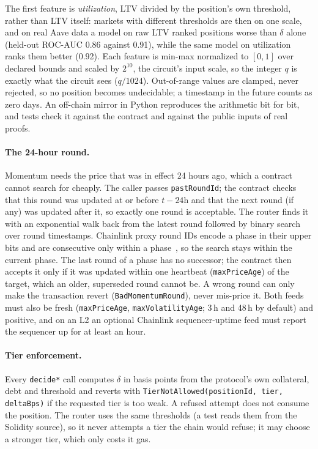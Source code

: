 \documentclass[sigconf,nonacm]{acmart}
\newcommand{\code}[1]{\texttt{\smaller #1}}
\begin{document}
The first feature is \emph{utilization}, LTV divided by the position's own threshold, rather than LTV itself: markets with different thresholds are then on one scale, and on real Aave data a model on raw LTV ranked positions worse than $\delta$ alone (held-out ROC-AUC 0.86 against 0.91), while the same model on utilization ranks them better (0.92). Each feature is min-max normalized to $[0,1]$ over declared bounds and scaled by $2^{10}$, the circuit's input scale, so the integer $q$ is exactly what the circuit sees ($q/1024$). Out-of-range values are clamped, never rejected, so no position becomes undecidable; a timestamp in the future counts as zero days. An off-chain mirror in Python reproduces the arithmetic bit for bit, and tests check it against the contract and against the public inputs of real proofs.

\paragraph{The 24-hour round.} Momentum needs the price that was in effect 24 hours ago, which a contract cannot search for cheaply. The caller passes \code{pastRoundId}; the contract checks that this round was updated at or before $t-24\text{h}$ and that the next round (if any) was updated after it, so exactly one round is acceptable. The router finds it with an exponential walk back from the latest round followed by binary search over round timestamps. Chainlink proxy round IDs encode a phase in their upper bits and are consecutive only within a phase~\cite{chainlinkhistorical}, so the search stays within the current phase. The last round of a phase has no successor; the contract then accepts it only if it was updated within one heartbeat (\code{maxPriceAge}) of the target, which an older, superseded round cannot be. A wrong round can only make the transaction revert (\code{BadMomentumRound}), never mis-price it. Both feeds must also be fresh (\code{maxPriceAge}, \code{maxVolatilityAge}; 3\,h and 48\,h by default) and positive, and on an L2 an optional Chainlink sequencer-uptime feed must report the sequencer up for at least an hour.

\paragraph{Tier enforcement.} Every \code{decide*} call computes $\delta$ in basis points from the protocol's own collateral, debt and threshold and reverts with \code{TierNotAllowed(positionId, tier, deltaBps)} if the requested tier is too weak. A refused attempt does not consume the position. The router uses the same thresholds (a test reads them from the Solidity source), so it never attempts a tier the chain would refuse; it may choose a stronger tier, which only costs it gas.
\end{document}
